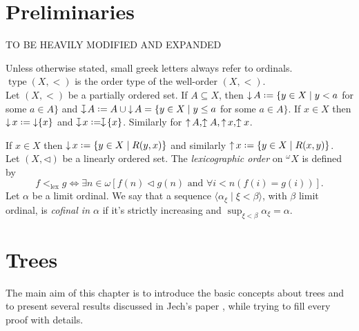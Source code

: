 \documentclass[12pt,a4paper]{report}
\theoremstyle{definition}
\theoremstyle{num.custom-title}
\DeclareMathOperator{\sse}{\subseteq}
\DeclareMathOperator{\type}{type}
\DeclareMathOperator{\down}{\downarrow}
\DeclareMathOperator{\up}{\uparrow}
\newcommand{\downmapsto}{%
           \mathrel{\raisebox{.1em}{%
							\rotatebox[origin=c]{-90}{$\mapsto$}}}}
\newcommand{\upmapsto}{%
           \mathrel{\raisebox{.08em}{%
							\rotatebox[origin=c]{90}{$\mapsto$}}}}
\newcommand*{\defeq}{\mathrel{\rlap{%
                     \raisebox{0.3ex}{$\cdot$}}%
                     \raisebox{-0.3ex}{$\cdot$}}%
                     =}
\renewcommand{\iff}{\Leftrightarrow}
\begin{document}

\chapter*{Preliminaries}

\begin{center}
TO BE HEAVILY MODIFIED AND EXPANDED
\end{center}

Unless otherwise stated, small greek letters always refer to ordinals.\\
$\type (X,<)$ is the order type of the well-order $(X,<)$.\\
Let $(X,<)$ be a partially ordered set. If $A \sse X$, then $\down A \defeq \{y \in X \mid y < a$ for some $ a \in A \}$ and $\downmapsto A \defeq A \cup \down A = \{y \in X \mid y \leq a$ for some $a \in A \}$. If $x \in X$ then $\down x \defeq \down \{x\}$ and $\downmapsto x \defeq \downmapsto \{x\}$. Similarly for $\up A, \upmapsto A, \up x, \upmapsto x$.

If $x \in X$ then $\down x \defeq \{y \in X \mid R(y,x)\}$ and similarly $\up x \defeq \{y \in X \mid R(x,y)\}$. \\
Let $(X,\lhd)$ be a linearly ordered set. The \emph{lexicographic order} on $^{\omega} X$ is defined by
\[
f <_{\text{lex}} g \iff \exists n \in \omega [f(n) \lhd g(n) \text{ and } \forall i < n (f(i)=g(i))].
\]
Let $\alpha$ be a limit ordinal. We say that a sequence $\langle \alpha_\xi \mid \xi < \beta \rangle$, with $\beta$ limit ordinal, is \emph{cofinal in $\alpha$} if it's strictly increasing and $\sup_{\xi < \beta} \alpha_\xi = \alpha$.

\chapter{Trees}

The main aim of this chapter is to introduce the basic concepts about trees and to present several results discussed in Jech's paper \cite{Jec1971}, while trying to fill every proof with details.
\end{document}
